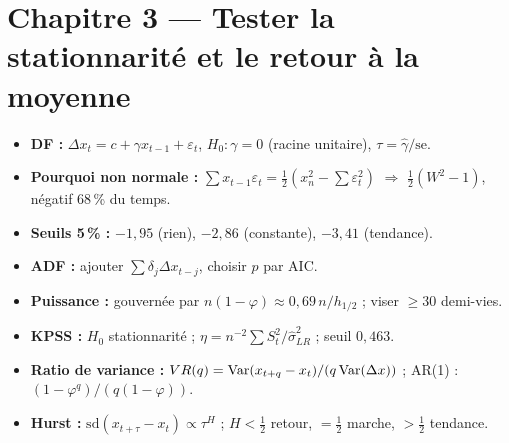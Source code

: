 \section*{Chapitre 3 — Tester la stationnarité et le retour à la moyenne}
\begin{itemize}[leftmargin=1.2em,itemsep=0.05em]
\item \textbf{DF :} $\Delta x_t = c + \gamma x_{t-1} + \varepsilon_t$, $H_0 : \gamma = 0$ (racine unitaire), $\tau = \hat\gamma/\mathrm{se}$.
\item \textbf{Pourquoi non normale :} $\sum x_{t-1}\varepsilon_t = \frac12(x_n^2 - \sum\varepsilon_t^2)$ $\Rightarrow$ $\frac12(W^2-1)$, négatif 68\,\% du temps.
\item \textbf{Seuils 5\,\% :} $-1{,}95$ (rien), $-2{,}86$ (constante), $-3{,}41$ (tendance).
\item \textbf{ADF :} ajouter $\sum\delta_j\Delta x_{t-j}$, choisir $p$ par AIC.
\item \textbf{Puissance :} gouvernée par $n(1-\varphi)\approx 0{,}69\,n/h_{1/2}$ ; viser $\ge 30$ demi-vies.
\item \textbf{KPSS :} $H_0$ stationnarité ; $\eta = n^{-2}\sum S_t^2/\hat\sigma^2_{LR}$ ; seuil $0{,}463$.
\item \textbf{Ratio de variance :} $VR(q) = \operatorname{Var}(x_{t+q}-x_t)/(q\operatorname{Var}(\Delta x))$ ; AR(1) : $(1-\varphi^q)/(q(1-\varphi))$.
\item \textbf{Hurst :} $\mathrm{sd}(x_{t+\tau}-x_t)\propto\tau^H$ ; $H<\frac12$ retour, $=\frac12$ marche, $>\frac12$ tendance.
\end{itemize}

